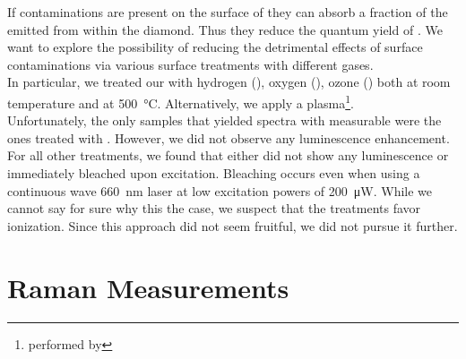 				If contaminations are present on the surface of \nds they can absorb a fraction of the \fl emitted from within the diamond. Thus they reduce the quantum yield of \sivs. We want to explore the possibility of reducing the detrimental effects of surface contaminations via various surface treatments with different gases.
				\\
				In particular, we treated our \nds with hydrogen (), oxygen (), ozone () both at room temperature and at  \SI{500}{\celsius}. Alternatively, we apply a  plasma\footnote{performed by \williams}.
				\\
				Unfortunately, the only samples that yielded spectra with measurable \ZPLs were the ones treated with . However, we did not observe any luminescence enhancement.
				\\
				For all other treatments, we found that \nds either did not show any luminescence or immediately bleached upon excitation. Bleaching occurs even when using a continuous wave \SI{660}{nm} laser at low excitation powers of \SI{200}{\micro\watt}. While we cannot say for sure why this the case, we suspect that the treatments favor \siv ionization. Since this approach did not seem fruitful, we did not pursue it further.
				\\

		\section{Raman Measurements} \label{sec::raman}

